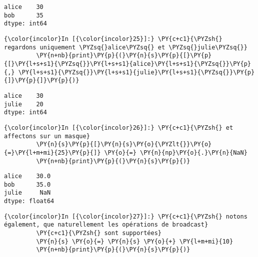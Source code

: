     \begin{Verbatim}[commandchars=\\\{\},frame=single,framerule=0.3mm,rulecolor=\color{cellframecolor}]
alice    30
bob      35
dtype: int64
\end{Verbatim}

    \begin{Verbatim}[commandchars=\\\{\},frame=single,framerule=0.3mm,rulecolor=\color{cellframecolor}]
{\color{incolor}In [{\color{incolor}25}]:} \PY{c+c1}{\PYZsh{} regardons uniquement \PYZsq{}alice\PYZsq{} et \PYZsq{}julie\PYZsq{}}
         \PY{n+nb}{print}\PY{p}{(}\PY{n}{s}\PY{p}{[}\PY{p}{[}\PY{l+s+s1}{\PYZsq{}}\PY{l+s+s1}{alice}\PY{l+s+s1}{\PYZsq{}}\PY{p}{,} \PY{l+s+s1}{\PYZsq{}}\PY{l+s+s1}{julie}\PY{l+s+s1}{\PYZsq{}}\PY{p}{]}\PY{p}{]}\PY{p}{)}
\end{Verbatim}


    \begin{Verbatim}[commandchars=\\\{\},frame=single,framerule=0.3mm,rulecolor=\color{cellframecolor}]
alice    30
julie    20
dtype: int64
\end{Verbatim}

    \begin{Verbatim}[commandchars=\\\{\},frame=single,framerule=0.3mm,rulecolor=\color{cellframecolor}]
{\color{incolor}In [{\color{incolor}26}]:} \PY{c+c1}{\PYZsh{} et affectons sur un masque}
         \PY{n}{s}\PY{p}{[}\PY{n}{s}\PY{o}{\PYZlt{}}\PY{o}{=}\PY{l+m+mi}{25}\PY{p}{]} \PY{o}{=} \PY{n}{np}\PY{o}{.}\PY{n}{NaN}
         \PY{n+nb}{print}\PY{p}{(}\PY{n}{s}\PY{p}{)}
\end{Verbatim}


    \begin{Verbatim}[commandchars=\\\{\},frame=single,framerule=0.3mm,rulecolor=\color{cellframecolor}]
alice    30.0
bob      35.0
julie     NaN
dtype: float64
\end{Verbatim}

    \begin{Verbatim}[commandchars=\\\{\},frame=single,framerule=0.3mm,rulecolor=\color{cellframecolor}]
{\color{incolor}In [{\color{incolor}27}]:} \PY{c+c1}{\PYZsh{} notons également, que naturellement les opérations de broadcast}
         \PY{c+c1}{\PYZsh{} sont supportées}
         \PY{n}{s} \PY{o}{=} \PY{n}{s} \PY{o}{+} \PY{l+m+mi}{10}
         \PY{n+nb}{print}\PY{p}{(}\PY{n}{s}\PY{p}{)}
\end{Verbatim}


